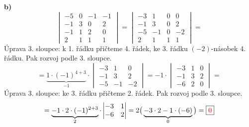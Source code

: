 \documentclass[11pt,a4paper]{article}
\newcommand{\vysl}[1]{\boxed{\color{red!75!black}#1}}
\newcommand{\krok}[1]{{\small\color{blue!60!black}#1}}
\begin{document}
\textbf{b)}
\[
\begin{vmatrix} -5 & 0 & -1 & -1\\ -1 & 3 & 0 & 2\\ -1 & 1 & 2 & 0\\ 2 & 1 & 1 & 1 \end{vmatrix}
= \begin{vmatrix} -3 & 1 & 0 & 0\\ -1 & 3 & 0 & 2\\ -5 & -1 & 0 & -2\\ 2 & 1 & 1 & 1 \end{vmatrix} =
\]
\krok{Úprava 3. sloupce: k 1. řádku přičteme 4. řádek, ke 3. řádku $(-2)$-násobek 4. řádku. Pak rozvoj podle 3. sloupce.}
\[
= \underbrace{1\cdot(-1)^{4+3}}_{-1}\cdot\begin{vmatrix} -3 & 1 & 0\\ -1 & 3 & 2\\ -5 & -1 & -2 \end{vmatrix}
= -1\cdot\begin{vmatrix} -3 & 1 & 0\\ -1 & 3 & 2\\ -6 & 2 & 0 \end{vmatrix} =
\]
\krok{Úprava 3. sloupce: ke 3. řádku přičteme 2. řádek. Pak rozvoj podle 3. sloupce.}
\[
= \underbrace{-1\cdot2\cdot(-1)^{2+3}}_{2}\cdot\begin{vmatrix} -3 & 1\\ -6 & 2 \end{vmatrix}
= 2\big(\underbrace{-3\cdot2-1\cdot(-6)}_{0}\big) = \vysl{0}
\]
\end{document}
